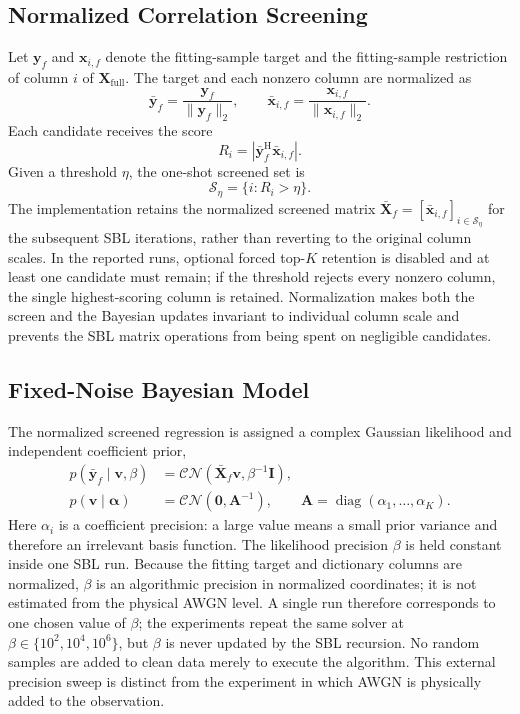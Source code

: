 \documentclass[conference]{IEEEtran}
\newcommand{\CN}{\mathcal{CN}}
\newcommand{\vect}[1]{\boldsymbol{#1}}
\newcommand{\mat}[1]{\mathbf{#1}}
\newcommand{\herm}{\mathrm{H}}
\newcommand{\diag}{\operatorname{diag}}
\begin{document}
\subsection{Normalized Correlation Screening}
Let $\mat y_f$ and $\mat x_{i,f}$ denote the fitting-sample target and the fitting-sample restriction of column $i$ of $\mat X_{\mathrm{full}}$. The target and each nonzero column are normalized as
\begin{equation}
 \bar{\mat y}_f=\frac{\mat y_f}{\|\mat y_f\|_2},\qquad
 \bar{\mat x}_{i,f}=\frac{\mat x_{i,f}}{\|\mat x_{i,f}\|_2}.
 \label{eq:normalize}
\end{equation}
Each candidate receives the score
\begin{equation}
 R_i=\left|\bar{\mat y}_f^{\herm}\bar{\mat x}_{i,f}\right|.
 \label{eq:corr}
\end{equation}
Given a threshold $\eta$, the one-shot screened set is
\begin{equation}
 \mathcal S_{\eta}=\{i:R_i>\eta\}.
 \label{eq:screen}
\end{equation}
The implementation retains the normalized screened matrix $\bar{\mat X}_f=[\bar{\mat x}_{i,f}]_{i\in\mathcal S_{\eta}}$ for the subsequent SBL iterations, rather than reverting to the original column scales. In the reported runs, optional forced top-$K$ retention is disabled and at least one candidate must remain; if the threshold rejects every nonzero column, the single highest-scoring column is retained. Normalization makes both the screen and the Bayesian updates invariant to individual column scale and prevents the SBL matrix operations from being spent on negligible candidates.

\subsection{Fixed-Noise Bayesian Model}
The normalized screened regression is assigned a complex Gaussian likelihood and independent coefficient prior,
\begin{align}
 p(\bar{\mat y}_f\mid\mat v,\beta)
   &=\CN(\bar{\mat X}_f\mat v,\beta^{-1}\mat I), \\
 p(\mat v\mid\vect\alpha)
   &=\CN(\mat 0,\mat A^{-1}),\qquad
     \mat A=\diag(\alpha_1,\ldots,\alpha_K).
 \label{eq:priors}
\end{align}
Here $\alpha_i$ is a coefficient precision: a large value means a small prior variance and therefore an irrelevant basis function. The likelihood precision $\beta$ is held constant inside one SBL run. Because the fitting target and dictionary columns are normalized, $\beta$ is an algorithmic precision in normalized coordinates; it is not estimated from the physical AWGN level. A single run therefore corresponds to one chosen value of $\beta$; the experiments repeat the same solver at $\beta\in\{10^2,10^4,10^6\}$, but $\beta$ is never updated by the SBL recursion. No random samples are added to clean data merely to execute the algorithm. This external precision sweep is distinct from the experiment in which AWGN is physically added to the observation.
\end{document}
